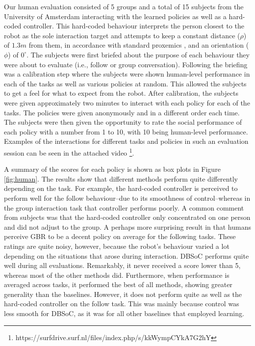 \documentclass[letterpaper, 10 pt, conference]{ieeeconf}
\begin{document}
Our human evaluation consisted of 5 groups and a total of 15 subjects from the University of Amsterdam interacting with the learned policies as well as a hard-coded controller. This hard-coded behaviour interprets the person closest to the robot as the sole interaction target and attempts to keep a constant distance ($\rho$) of $1.3m$ from them, in accordance with standard proxemics \cite{hall1966hidden}, and an orientation ($\phi$) of $0^\circ$. The subjects were first briefed about the purpose of each behaviour they were about to evaluate (i.e., follow or group conversation). Following the briefing was a calibration step where the subjects were shown human-level performance in each of the tasks as well as various policies at random. This allowed the subjects to get a feel for what to expect from the robot. After calibration, the subjects were given approximately two minutes to interact with each policy for each of the tasks. The policies were given anonymously and in a different order each time. The subjects were then given the opportunity to rate the social performance of each policy with a number from 1 to 10, with 10 being human-level performance. Examples of the interactions for different tasks and policies in such an evaluation session can be seen in the attached video \footnote{https://surfdrive.surf.nl/files/index.php/s/kkWympCYkA7G2hY}.

A summary of the scores for each policy is shown as box plots in Figure \ref{fig:human}. The results show that different methods perform quite differently depending on the task. For example, the hard-coded controller is perceived to perform  well for the follow behaviour--due to its smoothness of control--whereas in the group interaction task that controller performs poorly. A common comment from subjects was that the hard-coded controller only concentrated on one person and did not adjust to the group. A perhaps more surprising result in that humans perceive GBR to be a decent policy on average for the following tasks. These ratings are quite noisy, however, because the robot's behaviour varied a lot depending on the situations that arose during interaction. DBSoC performs quite well during all evaluations. Remarkably, it never received a score lower than 5, whereas most of the other methods did.  Furthermore, when performance is averaged across tasks, it performed the best of all methods, showing greater generality than the baselines.  However, it does not perform quite as well as the hard-coded controller on the follow task. This was mainly because control was less smooth for DBSoC, as it was for all other baselines that employed learning.
\end{document}
